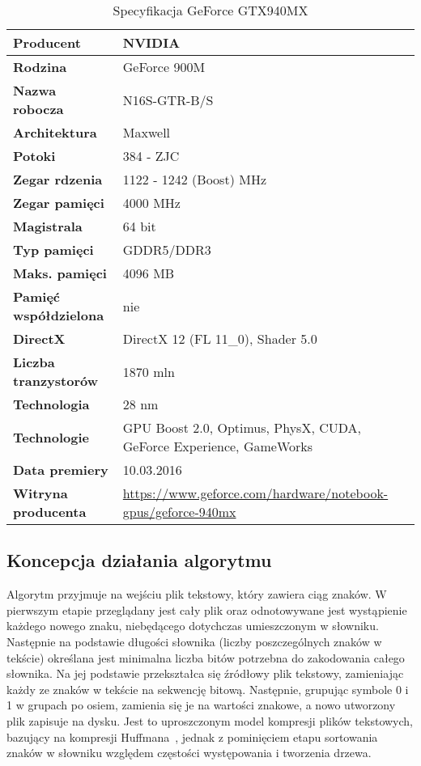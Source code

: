 \documentclass[12pt,a4paper,titlepage]{article}
\begin{document}
\begin{table}[H]
\centering
\caption{Specyfikacja GeForce GTX940MX}
\begin{tabular}[H]{|p{4.5cm}|p{7.5cm}|}
\hline
\textbf{Producent} & NVIDIA \\
\hline
\textbf{Rodzina} & GeForce 900M \\
\hline
\textbf{Nazwa robocza} & N16S-GTR-B/S \\
\hline
\textbf{Architektura} & Maxwell \\
\hline
\textbf{Potoki} & 384 - ZJC \\
\hline
\textbf{Zegar rdzenia} & 1122 - 1242 (Boost) MHz \\
\hline
\textbf{Zegar pamięci} & 4000 MHz \\
\hline
\textbf{Magistrala} & 64 bit \\
\hline
\textbf{Typ pamięci} & GDDR5/DDR3 \\
\hline
\textbf{Maks. pamięci} & 4096 MB \\
\hline
\textbf{Pamięć współdzielona} & nie \\
\hline
\textbf{DirectX} & DirectX 12 (FL 11\_0), Shader 5.0 \\
\hline
\textbf{Liczba tranzystorów} & 1870 mln \\
\hline
\textbf{Technologia} & 28 nm \\
\hline
\textbf{Technologie} & GPU Boost 2.0, Optimus, PhysX, CUDA, GeForce Experience, GameWorks \\
\hline
\textbf{Data premiery} & 10.03.2016 \\
\hline
\textbf{Witryna producenta} & \url{https://www.geforce.com/hardware/notebook-gpus/geforce-940mx} \\
\hline
\end{tabular}
\end{table}
\subsection{Koncepcja działania algorytmu}
Algorytm przyjmuje na wejściu plik tekstowy, który zawiera ciąg znaków. W pierwszym etapie przeglądany jest cały plik oraz odnotowywane jest wystąpienie każdego nowego znaku, niebędącego dotychczas umieszczonym w słowniku. Następnie na podstawie długości słownika (liczby poszczególnych znaków w tekście) określana jest minimalna liczba bitów potrzebna do zakodowania całego słownika. Na jej podstawie przekształca się źródłowy plik tekstowy, zamieniając każdy ze znaków w tekście na sekwencję bitową. Następnie, grupując symbole 0 i 1 w grupach po osiem, zamienia się je na wartości znakowe, a nowo utworzony plik zapisuje na dysku. Jest to uproszczonym model kompresji plików tekstowych, bazujący na kompresji Huffmana~\cite{kompresja-huffmana}, jednak z pominięciem etapu sortowania znaków w słowniku względem częstości występowania i tworzenia drzewa.
\end{document}

